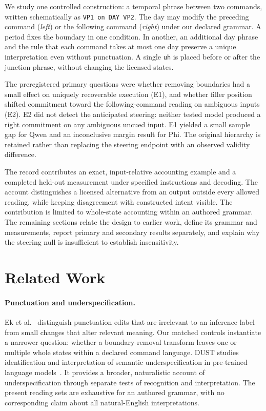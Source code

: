 \documentclass[11pt]{article}
\begin{document}
We study one controlled construction: a temporal phrase between two commands, written schematically as \texttt{VP1 on DAY VP2}. The day may modify the preceding command (\emph{left}) or the following command (\emph{right}) under our declared grammar. A period fixes the boundary in one condition. In another, an additional day phrase and the rule that each command takes at most one day preserve a unique interpretation even without punctuation. A single \texttt{uh} is placed before or after the junction phrase, without changing the licensed states.

The preregistered primary questions were whether removing boundaries had a small effect on uniquely recoverable execution (E1), and whether filler position shifted commitment toward the following-command reading on ambiguous inputs (E2). E2 did not detect the anticipated steering: neither tested model produced a right commitment on any ambiguous uncued input. E1 yielded a small sample gap for Qwen and an inconclusive margin result for Phi. The original hierarchy is retained rather than replacing the steering endpoint with an observed validity difference.

The record contributes an exact, input-relative accounting example and a completed held-out measurement under specified instructions and decoding. The account distinguishes a licensed alternative from an output outside every allowed reading, while keeping disagreement with constructed intent visible. The contribution is limited to whole-state accounting within an authored grammar. The remaining sections relate the design to earlier work, define its grammar and measurements, report primary and secondary results separately, and explain why the steering null is insufficient to establish insensitivity.

\section{Related Work}
\paragraph{Punctuation and underspecification.}
Ek et al.\ \cite{ek-etal-2020-punctuation} distinguish punctuation edits that are irrelevant to an inference label from small changes that alter relevant meaning. Our matched controls instantiate a narrower question: whether a boundary-removal transform leaves one or multiple whole states within a declared command language. DUST studies identification and interpretation of semantic underspecification in pre-trained language models\ \cite{wildenburg-etal-2024-pre}. It provides a broader, naturalistic account of underspecification through separate tests of recognition and interpretation. The present reading sets are exhaustive for an authored grammar, with no corresponding claim about all natural-English interpretations.
\end{document}
